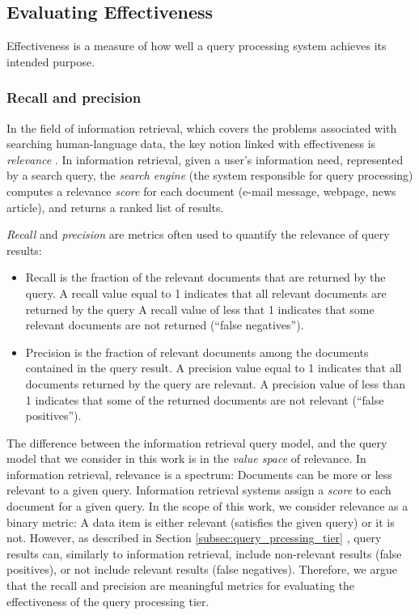 \subsection{Evaluating Effectiveness}

Effectiveness is a measure of how well a query processing system achieves its intended purpose.

\subsubsection{Recall and precision}

In the field of information retrieval, which covers the problems associated with searching human-language data,
the key notion linked with effectiveness is \textit{relevance} \cite{buttcher:informationretrieval}.
In information retrieval, given a user's information need, represented by a search query, the \textit{search engine}
(the system responsible for query processing) computes a relevance \textit{score} for each document (e-mail message,
webpage, news article), and returns a ranked list of results.

\textit{Recall} and \textit{precision} are metrics often used to quantify the relevance of query results:
\begin{itemize}
  \item Recall is the fraction of the relevant documents that are returned by the query.
  A recall value equal to 1 indicates that all relevant documents are returned by the query
  A recall value of less that 1 indicates that some relevant documents are not returned (``false negatives'').

  \item Precision is the fraction of relevant documents among the documents contained in the query result.
  A precision value equal to 1 indicates that all documents returned by the query are relevant.
  A precision value of less than 1 indicates that some of the returned documents are not relevant (``false positives'').
\end{itemize}

The difference between the information retrieval query model, and the query model that we consider in this work is in the
\textit{value space} of relevance.
In information retrieval, relevance is a spectrum:
Documents can be more or less relevant to a given query.
Information retrieval systems assign a \textit{score} to each document for a given query.
In the scope of this work, we consider relevance as a binary metric:
A data item is either relevant (satisfies the given query) or it is not.
However, as described in Section \ref{subsec:query_prcessing_tier} , query results
can, similarly to information retrieval, include non-relevant results (false positives),
or not include relevant results (false negatives).
Therefore, we argue that the recall and precision are meaningful metrics for evaluating the effectiveness of the query processing tier.

